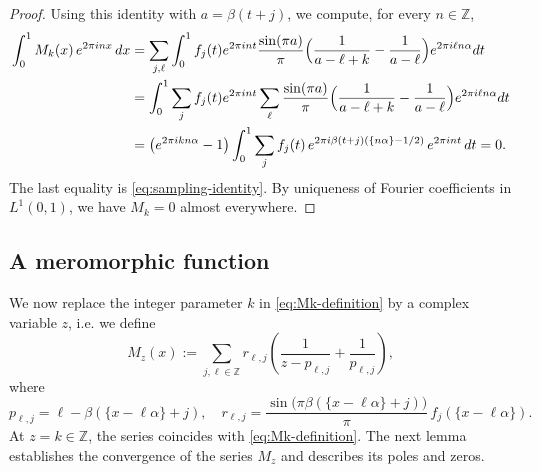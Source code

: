 \documentclass[reqno,a4paper,12pt]{amsart}
\numberwithin{equation}{section}
\def\Z{{\mathbb Z}}
\newcommand\1{\mathds{1}}
\begin{document}
\begin{proof}
Using this identity with $a=\beta(t+j)$, we compute, for every $n\in\Z$,
\begin{align*}
 \int_0^1 M_k(x)\,e^{2\pi inx}\,dx
 &=\sum_{j,\ell}\int_0^1 f_j(t)e^{2\pi int}
 \frac{\sin(\pi a)}{\pi}
 \Bigl(\frac1{a-\ell+k}-\frac1{a-\ell}\Bigr)
 e^{2\pi i\ell n\alpha}dt\\
 &=\int_0^1\sum_j f_j(t)e^{2\pi int}\sum_{\ell}
 \frac{\sin(\pi a)}{\pi}
 \Bigl(\frac1{a-\ell+k}-\frac1{a-\ell}\Bigr)
 e^{2\pi i\ell n\alpha}dt\\
 &=\bigl(e^{2\pi ikn\alpha}-1\bigr)
 \int_0^1\sum_j f_j(t)\,
 e^{2\pi i\beta(t+j)(\{n\alpha\}-1/2)}\,e^{2\pi int}\,dt=0.
\end{align*}
The last equality is \eqref{eq:sampling-identity}. By uniqueness of
Fourier coefficients in $L^1(0,1)$, we have $M_k=0$ almost everywhere.
\end{proof}

\subsection{A meromorphic function}
We now replace the integer parameter $k$ in \eqref{eq:Mk-definition}
by a complex variable $z$, i.e. we define
\begin{equation}\label{eq:M-definition}
 M_z(x):=\sum_{j,\ell\in\Z}
 r_{\ell,j}\left(\frac1{z-p_{\ell,j}}+\frac1{p_{\ell,j}}\right),
\end{equation}
where
\begin{equation}\label{eq:M-poles}
 p_{\ell,j}=\ell-\beta(\{x-\ell\alpha\}+j),
 \quad
 r_{\ell,j}=\frac{\sin\!\bigl(\pi\beta(\{x-\ell\alpha\}+j)\bigr)}{\pi}\,
 f_j(\{x-\ell\alpha\}).
\end{equation}
At $z=k\in\Z$, the series coincides with \eqref{eq:Mk-definition}. The next lemma establishes the convergence
of the series $M_z$ and describes its poles and zeros.
\end{document}
